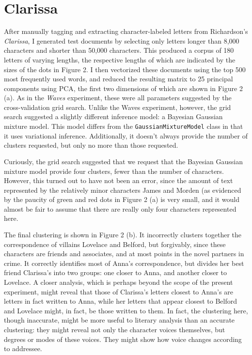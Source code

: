 \documentclass[12pt]{article}
\begin{document}
\section{Clarissa}\label{clarissa}

After manually tagging and extracting character-labeled letters from
Richardson's \emph{Clarissa}, I generated test documents by selecting
only letters longer than 8,000 characters and shorter than 50,000
characters. This produced a corpus of 180 letters of varying lengths,
the respective lengths of which are indicated by the sizes of the dots
in Figure 2. I then vectorized these documents using the top 500 most
frequently used words, and reduced the resulting matrix to 25 principal
components using PCA, the first two dimensions of which are shown in
Figure 2 (a). As in the \emph{Waves} experiment, these were all
parameters suggested by the cross-validation grid search. Unlike the
Waves experiment, however, the grid search suggested a slightly
different inference model: a Bayesian Gaussian mixture model. This model
differs from the \texttt{GaussianMixtureModel} class in that it uses
variational inference. Additionally, it doesn't always provide the
number of clusters requested, but only no more than those requested.

Curiously, the grid search suggested that we request that the Bayesian
Gaussian mixture model provide four clusters, fewer than the number of
characters. However, this turned out to have not been an error, since
the amount of text represented by the relatively minor characters James
and Morden (as evidenced by the paucity of green and red dots in Figure
2 (a) is very small, and it would almost be fair to assume that there
are really only four characters represented here.

The final clustering is shown in Figure 2 (b). It incorrectly clusters
together the correspondence of villains Lovelace and Belford, but
forgivably, since these characters are friends and associates, and at
most points in the novel partners in crime. It correctly identifies most
of Anna's correspondence, but divides her best friend Clarissa's into
two groups: one closer to Anna, and another closer to Lovelace. A closer
analysis, which is perhaps beyond the scope of the present experiment,
might reveal that those of Clarissa's letters closest to Anna's are
letters in fact written to Anna, while her letters that appear closest
to Belford and Lovelace might, in fact, be those written to them. In
fact, the clustering here, though inaccurate, might be more useful to
literary analysis than an accurate clustering: they might reveal not
only the character voices themselves, but degrees or modes of these
voices. They might show how voice changes according to addressee.
\end{document}
